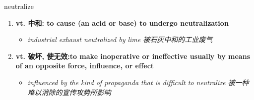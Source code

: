 
\begin{frame}
{\huge neutralize}
\begin{center}
\begin{enumerate}\Large
  \item \textbf{vt. 中和: to cause (an acid or base) to undergo neutralization}
  \begin{itemize}
    \item \em{\Large{industrial exhaust neutralized by lime 被石灰中和的工业废气}}
  \end{itemize}
  \item \textbf{vt. 破坏, 使无效:to make inoperative or ineffective usually by means of an opposite force, influence, or effect}
  \begin{itemize}
    \item \em{\Large{influenced by the kind of propaganda that is difficult to neutralize 被一种难以消除的宣传攻势所影响}}
  \end{itemize}
\end{enumerate}
\end{center}
\end{frame}
